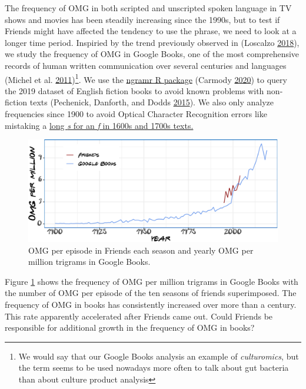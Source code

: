 \documentclass[]{article}
\begin{document}
The frequency of OMG in both scripted and unscripted spoken language in TV shows and movies has been steadily increasing since the 1990s, but to test if Friends might have affected the tendency to use the phrase, we need to look at a longer time period. Inspiried by the trend previously observed in (Loscalzo \protect\hyperlink{ref-loscalzo_2018}{2018}), we study the frequency of OMG in Google Books, one of the most comprehensive records of human written communication over several centuries and languages (Michel et al. \protect\hyperlink{ref-michel2011quantitative}{2011})\footnote{We would say that our Google Books analysis an example of \emph{culturomics}, but the term seems to be used nowadays more often to talk about gut bacteria than about culture product analysis}. We use the \href{https://github.com/seancarmody/ngramr}{ngramr R package} (Carmody \protect\hyperlink{ref-ngramr}{2020}) to query the 2019 dataset of English fiction books to avoid known problems with non-fiction texts (Pechenick, Danforth, and Dodds \protect\hyperlink{ref-pechenick2015characterizing}{2015}). We also only analyze frequencies since 1900 to avoid Optical Character Recognition errors like mistaking a \href{https://books.google.com/ngrams/graph?content=fuck\&year_start=1500\&year_end=2019}{long \emph{s} for an \emph{f} in 1600s and 1700s texts.}

\begin{figure}

{\centering \includegraphics{Friends_HPS_pdf_files/figure-latex/books1-1} 

}

\caption{OMG per episode in Friends each season and yearly OMG per million trigrams in Google Books.}\label{fig:books1}
\end{figure}

Figure \ref{fig:books1} shows the frequency of OMG per million trigrams in Google Books with the number of OMG per episode of the ten seasons of friends superimposed. The frequency of OMG in books has consistently increased over more than a century. This rate apparently accelerated after Friends came out. Could Friends be responsible for additional growth in the frequency of OMG in books?
\end{document}
